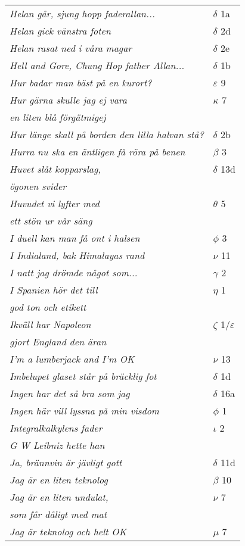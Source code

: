 \documentclass[a6paper,10pt]{article}
\begin{document}
\newpage
\begin{table}[!h]
\begin{tabular}{l l}
\textit{Helan går, sjung hopp faderallan...}	&$\delta$ 1a\\
\textit{Helan gick  vänstra foten}	&$\delta$ 2d\\
\textit{Helan rasat ned i våra magar}	&$\delta$ 2e\\
\textit{Hell and Gore, Chung Hop father Allan...}	&$\delta$ 1b\\
\textit{Hur badar man bäst på en kurort?}	&$\varepsilon$ 9\\
\textit{Hur gärna skulle jag ej vara}	&$\kappa$ 7\\
\textit{en liten blå förgätmigej} &\\
\textit{Hur länge skall på borden den lilla halvan stå?}	&$\delta$ 2b\\
\textit{Hurra nu ska en äntligen få röra på benen}	&$\beta$ 3\\
\textit{Huvet slåt kopparslag,}	&$\delta$ 13d\\
\textit{ögonen svider} &\\
\textit{Huvudet vi lyfter med}	&$\theta$ 5\\
\textit{ett stön ur vår säng} &\\
\textit{I duell kan man få ont i halsen}&$\phi$ 3\\
\textit{I Indialand, bak Himalayas rand}	&$\nu$ 11\\
\textit{I natt jag drömde något som...}	&$\gamma$ 2\\
\textit{I Spanien hör det till}	&$\eta$ 1\\
\textit{god ton och etikett} &\\
\textit{Ikväll har Napoleon}	&$\zeta$ 1/$\varepsilon$\\
\textit{gjort England den äran} &\\
\textit{I'm a lumberjack and I'm OK}	&$\nu$ 13\\
\textit{Imbelupet glaset står på bräcklig fot}	&$\delta$ 1d\\
\textit{Ingen har det så bra som jag}	&$\delta$ 16a\\
\textit{Ingen här vill lyssna på min visdom} &$\phi$ 1\\
\textit{Integralkalkylens fader}	&$\iota$ 2\\
\textit{G W Leibniz hette han} &\\
\textit{Ja, brännvin är jävligt gott}	&$\delta$ 11d\\
\textit{Jag är en liten teknolog}	&$\beta$ 10\\
\textit{Jag är en liten undulat,}	&$\nu$ 7\\
\textit{som får dåligt med mat} &\\
\textit{Jag är teknolog och helt OK}	&$\mu$ 7\\
\end{tabular}
\end{table}
\end{document}

